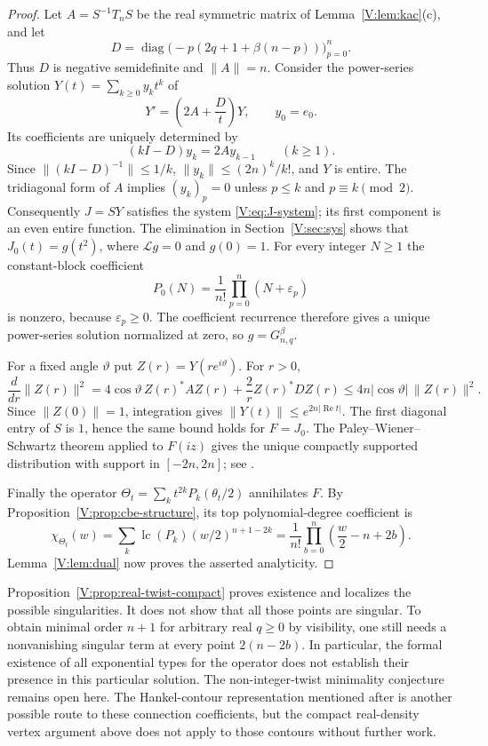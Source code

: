 \documentclass[11pt,a4paper]{article}
\theoremstyle{definition}
\theoremstyle{remark}
\numberwithin{equation}{section}
\begin{document}
\begin{proof}
Let $A=S^{-1}T_nS$ be the real symmetric matrix of
Lemma~\ref{V:lem:kac}(c), and let
\[
 D=\operatorname{diag}\bigl(-p(2q+1+\beta(n-p))\bigr)_{p=0}^n.
\]
Thus $D$ is negative semidefinite and $\|A\|=n$.
Consider the power-series solution
$Y(t)=\sum_{k\ge0}y_kt^k$ of
\[
 Y'=\left(2A+\frac Dt\right)Y,\qquad y_0=e_0.
\]
Its coefficients are uniquely determined by
\[
 (kI-D)y_k=2Ay_{k-1}\qquad(k\ge1).
\]
Since $\|(kI-D)^{-1}\|\le1/k$,
$\|y_k\|\le(2n)^k/k!$, and $Y$ is entire.
The tridiagonal form of $A$ implies
$(y_k)_p=0$ unless $p\le k$ and $p\equiv k\pmod2$.
Consequently $J=SY$ satisfies the system
\eqref{V:eq:J-system}; its first component is an even entire function.
The elimination in Section~\ref{V:sec:sys} shows that
$J_0(t)=g(t^2)$, where $\mathcal Lg=0$ and $g(0)=1$.
For every integer $N\ge1$ the constant-block coefficient
\[
 P_0(N)=\frac1{n!}\prod_{p=0}^n(N+\varepsilon_p)
\]
is nonzero, because $\varepsilon_p\ge0$.
The coefficient recurrence therefore gives a unique power-series
solution normalized at zero, so $g=G^\beta_{n,q}$.

For a fixed angle $\vartheta$ put $Z(r)=Y(re^{i\vartheta})$.
For $r>0$,
\[
 \frac{d}{dr}\|Z(r)\|^2
 =4\cos\vartheta\,Z(r)^*AZ(r)
   +\frac2r Z(r)^*DZ(r)
 \le 4n|\cos\vartheta|\,\|Z(r)\|^2.
\]
Since $\|Z(0)\|=1$, integration gives
$\|Y(t)\|\le e^{2n|\operatorname{Re}t|}$.
The first diagonal entry of $S$ is $1$, hence the same bound holds
for $F=J_0$.
The Paley--Wiener--Schwartz theorem applied to $F(iz)$ gives the
unique compactly supported distribution with support in $[-2n,2n]$;
see \cite[\S7.3]{Hor90}.

Finally the operator
$\Theta_t=\sum_kt^{2k}P_k(\theta_t/2)$ annihilates $F$.
By Proposition~\ref{V:prop:cbe-structure}, its top polynomial-degree
coefficient is
\[
 \chi_{\Theta_t}(w)
  =\sum_k\operatorname{lc}(P_k)
           (w/2)^{n+1-2k}
  =\frac1{n!}\prod_{b=0}^n\left(\frac w2-n+2b\right).
\]
Lemma~\ref{V:lem:dual} now proves the asserted analyticity.
\end{proof}

Proposition~\ref{V:prop:real-twist-compact} proves existence and localizes
the possible singularities.  It does not show that all those points
are singular.  To obtain minimal order $n+1$ for arbitrary real
$q\ge0$ by visibility, one still needs a nonvanishing singular term
at every point $2(n-2b)$.  In particular, the formal existence of all
exponential types for the operator does not establish their presence
in this particular solution.  The non-integer-twist minimality
conjecture remains open here.  The Hankel-contour representation
mentioned after \cite[(2.3)]{FW26} is another possible route to these
connection coefficients, but the compact real-density vertex
argument above does not apply to those contours without further work.
\end{document}
